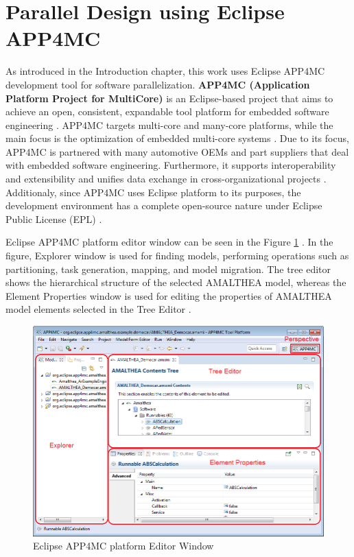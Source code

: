 \section{Parallel Design using Eclipse APP4MC} \label{app4mcchapter}
As introduced in the Introduction chapter, this work uses Eclipse APP4MC development tool for software parallelization. \textbf{APP4MC (Application Platform Project for MultiCore)} \cite{ICPDSSE} \cite{app4mcweb} is an Eclipse-based project that aims to achieve an open, consistent, expandable tool platform for embedded software engineering \cite{app4mchelp}. APP4MC targets multi-core and many-core platforms, while the main focus is the optimization of embedded multi-core systems \cite{app4mchelp}. Due to its focus, APP4MC is partnered with many automotive OEMs and part suppliers that deal with embedded software engineering.  Furthermore, it supports interoperability and extensibility and unifies data exchange in cross-organizational projects \cite{app4mcweb}. Additionaly, since APP4MC uses Eclipse platform to its purposes, the development environment has a complete open-source nature under Eclipse Public License (EPL) \cite{epl}. 

Eclipse APP4MC platform editor window can be seen in the Figure \ref{fig:app4mcenv} \cite{app4mchelp}. In the figure, Explorer window is used for finding models, performing operations such as partitioning, task generation, mapping, and model migration. The tree editor shows the hierarchical structure of the selected AMALTHEA model, whereas the Element Properties window is used for editing the properties of AMALTHEA model elements selected in the Tree Editor \cite{app4mchelp}.

\begin{figure}[!ht]
	\centering
	\captionsetup{justification=centering}
	\includegraphics[width=\textwidth]{content/images/app4mcenv.png}
	\caption{Eclipse APP4MC platform Editor Window \cite{app4mchelp}}
	\label{fig:app4mcenv}
\end{figure}


